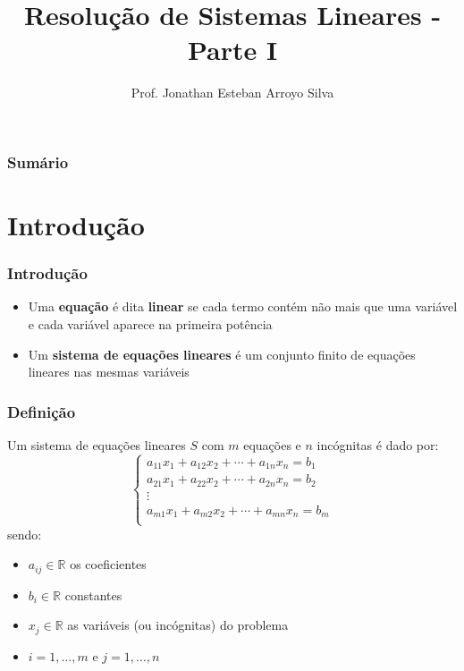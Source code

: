 \documentclass{beamer}
\title{Resolução de Sistemas Lineares - Parte I}
\author
{
	Prof. Jonathan Esteban Arroyo Silva	
}
\institute
{
	Departamento de Ciência da Computação\\
	Universidade Federal de São João del-Rei\\
	\texttt{silva.jea@ufsj.edu.br}
}
\date{}
\theoremstyle{mystyle}
\begin{document}
	
\begin{frame}[plain]
    \maketitle
\end{frame}

\begin{frame}[plain]
	\frametitle{Sumário}
	\tableofcontents
\end{frame}

\section{Introdução}

\begin{frame}
	\frametitle{Introdução}
	\begin{itemize}
		\item Uma \textbf{equação} é dita \textbf{linear} se cada termo contém não mais que uma variável e cada variável aparece na primeira potência
		\item Um \textbf{sistema de equações lineares} é um conjunto finito de equações lineares nas mesmas variáveis
	\end{itemize}
\end{frame}

\begin{frame}
	\frametitle{Definição}
	Um sistema de equações lineares $ S $ com $ m $ equações e $ n $ incógnitas é dado por:
	\begin{equation*}
		\left\lbrace 
		\begin{array}{c}
			a_{11}x_{1} + a_{12}x_{2} + \cdots + a_{1n}x_{n} = b_{1}\\
			a_{21}x_{1} + a_{22}x_{2} + \cdots + a_{2n}x_{n} = b_{2}\\
			\vdots\\
			a_{m1}x_{1} + a_{m2}x_{2} + \cdots + a_{mn}x_{n} = b_{m}\\
		\end{array}
		\right. 
	\end{equation*}
	sendo:
	\begin{itemize}
		\item $ a_{ij} \in \mathbb{R} $	os coeficientes
		\item $ b_{i} \in \mathbb{R} $ constantes
		\item $ x_{j} \in \mathbb{R} $ as variáveis (ou incógnitas) do problema
		\item $ i = 1,\ldots, m $ e $ j = 1,\ldots, n $
	\end{itemize}
\end{frame}
\end{document}
